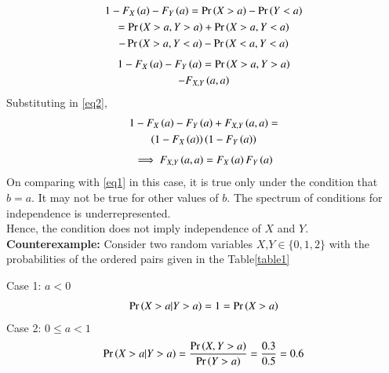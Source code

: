 \documentclass[journal,12pt,twocolumn]{IEEEtran}
\begin{document}
\begin{enumerate}
\begin{multline}
        1-F_X\left(a\right)-F_Y\left(a\right)=\Pr\left(X>a\right)-\Pr\left(Y<a\right)\\=\Pr\left(X>a,Y>a\right)+\Pr\left(X>a,Y<a\right)\\-\Pr\left(X>a,Y<a\right)-\Pr\left(X<a,Y<a\right)
    \end{multline}
    \begin{multline}
        1-F_X\left(a\right)-F_Y\left(a\right)=\Pr\left(X>a,Y>a\right)\\-F_{X,Y}\left(a,a\right)
    \end{multline}
    Substituting in \eqref{eq2},
    \begin{multline}
        1-F_X\left(a\right)-F_Y\left(a\right)+F_{X,Y}\left(a,a\right)=\\ \left(1-F_X\left(a\right)\right)\left(1-F_Y\left(a\right)\right)
    \end{multline}
    \begin{align}
        \implies F_{X,Y}\left(a,a\right)=F_X\left(a\right)F_Y\left(a\right)
    \end{align}
    On comparing with \eqref{eq1} in this case, it is true only under the condition that $b=a$. It may not be true for other values of $b$. The spectrum of conditions for independence is underrepresented.\\ Hence, the condition does not imply independence of $X$ and $Y$.\\
    \textbf{Counterexample:} Consider two random variables $X$,$Y \in \{0,1,2\}$ with the probabilities of the ordered pairs  given in the Table\ref{table1}
    \begin{center}
    \begin{table}[H]
    \centering
    \caption{}
    \label{table1}
    \end{table}
    \end{center}
    Case 1: $a<0$
    \begin{align}
        \Pr\left(X>a|Y>a\right)=1=\Pr\left(X>a\right)
    \end{align}
    Case 2: $0\leq a <1$
    \begin{align}
        \pr{X>a|Y>a}=\frac{\pr{X,Y>a}}{\pr{Y>a}}=\frac{0.3}{0.5}=0.6\\

\end{align}
\end{enumerate}
\end{document}
